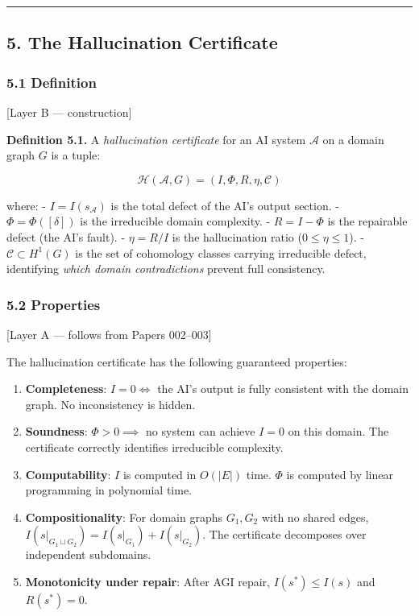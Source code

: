 \documentclass[
]{article}
\providecommand{\tightlist}{%
  \setlength{\itemsep}{0pt}\setlength{\parskip}{0pt}}
\begin{document}
\begin{center}\rule{0.5\linewidth}{0.5pt}\end{center}

\subsection{5. The Hallucination
Certificate}\label{the-hallucination-certificate}

\subsubsection{5.1 Definition}\label{definition}

{[}Layer B --- construction{]}

\textbf{Definition 5.1.} A \emph{hallucination certificate} for an AI
system \(\mathcal{A}\) on a domain graph \(G\) is a tuple:

\[\mathcal{H}(\mathcal{A}, G) = (I, \Phi, R, \eta, \mathcal{C})\]

where: - \(I = I(s_\mathcal{A})\) is the total defect of the AI's output
section. - \(\Phi = \Phi([\delta])\) is the irreducible domain
complexity. - \(R = I - \Phi\) is the repairable defect (the AI's
fault). - \(\eta = R / I\) is the hallucination ratio
(\(0 \leq \eta \leq 1\)). - \(\mathcal{C} \subset H^1(G)\) is the set of
cohomology classes carrying irreducible defect, identifying \emph{which
domain contradictions} prevent full consistency.

\subsubsection{5.2 Properties}\label{properties}

{[}Layer A --- follows from Papers 002--003{]}

The hallucination certificate has the following guaranteed properties:

\begin{enumerate}
\def\labelenumi{\arabic{enumi}.}
\tightlist
\item
  \textbf{Completeness}: \(I = 0 \iff\) the AI's output is fully
  consistent with the domain graph. No inconsistency is hidden.
\item
  \textbf{Soundness}: \(\Phi > 0 \implies\) no system can achieve
  \(I = 0\) on this domain. The certificate correctly identifies
  irreducible complexity.
\item
  \textbf{Computability}: \(I\) is computed in \(O(|E|)\) time. \(\Phi\)
  is computed by linear programming in polynomial time.
\item
  \textbf{Compositionality}: For domain graphs \(G_1, G_2\) with no
  shared edges, \(I(s|_{G_1 \sqcup G_2}) = I(s|_{G_1}) + I(s|_{G_2})\).
  The certificate decomposes over independent subdomains.
\item
  \textbf{Monotonicity under repair}: After AGI repair,
  \(I(s^*) \leq I(s)\) and \(R(s^*) = 0\).
\end{enumerate}
\end{document}
